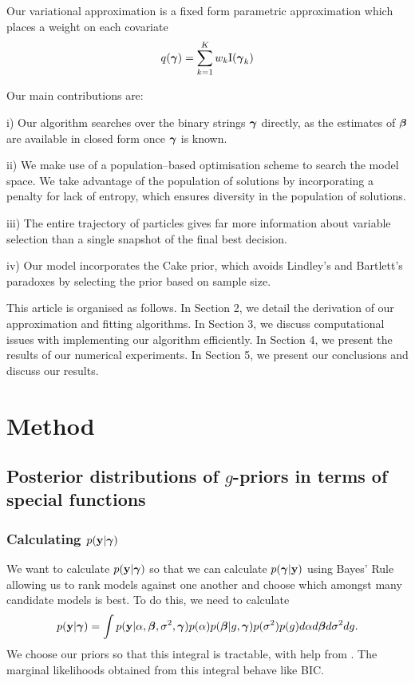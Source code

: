 Our variational approximation is a fixed form parametric approximation which places a weight on each covariate
\[
	q({\boldsymbol \gamma}) = \sum_{k=1}^K w_k \text{I}({\boldsymbol \gamma}_k)
\]


Our main contributions are:

i) Our algorithm searches over the binary strings ${\boldsymbol \gamma}$ directly, as the estimates of ${\boldsymbol \beta}$ are available 
in closed form once ${\boldsymbol \gamma}$ is known.

ii) We make use of a population--based optimisation scheme to search the model space. We take advantage of the
population of solutions by incorporating a penalty for lack of entropy, which ensures diversity in the
population of solutions.

iii) The entire trajectory of particles gives far more information about variable selection than a single
snapshot of the final best decision.

iv) Our model incorporates the Cake prior, which avoids Lindley's and Bartlett's paradoxes by selecting the
prior based on sample size.

This article is organised as follows. In Section 2, we detail the derivation of our approximation and fitting
algorithms. In Section 3, we discuss computational issues with implementing our algorithm efficiently. In
Section 4, we present the results of our numerical experiments. In Section 5, we present our conclusions and
discuss our results.

\section{Method}

\subsection{Posterior distributions of $g$-priors in terms of special functions}


\subsubsection{Calculating $p({\bf y} | {\boldsymbol \gamma})$}
We want to calculate $p({\bf y} | {\boldsymbol \gamma})$ so that we can calculate $p({\boldsymbol \gamma} | {\bf y})$ using Bayes' Rule 
allowing us to rank models against one another and choose which amongst many candidate models is best.
To do this, we need to calculate
$$p({\bf y} | {\boldsymbol \gamma}) = \int p({\bf y} | \alpha, {\boldsymbol \beta}, \sigma^2, {\boldsymbol \gamma}) p(\alpha) p({\boldsymbol \beta} | g, {\boldsymbol \gamma}) p(\sigma^2) p(g) d \alpha d {\boldsymbol \beta} d \sigma^2 d g.$$
We choose our priors so that this integral is tractable, with help from \cite{Gradshteyn1988}.
The marginal likelihoods obtained from this integral behave like BIC.

